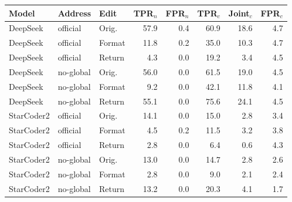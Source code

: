 \begin{tabular}{lllrrrrr}
\toprule
Model & Address & Edit & TPR$_n$ & FPR$_n$ & TPR$_c$ & Joint$_c$ & FPR$_c$ \\
\midrule
DeepSeek & official & Orig. & 57.9 & 0.4 & 60.9 & 18.6 & 4.7 \\
DeepSeek & official & Format & 11.8 & 0.2 & 35.0 & 10.3 & 4.7 \\
DeepSeek & official & Return & 4.3 & 0.0 & 19.2 & 3.4 & 4.5 \\
DeepSeek & no-global & Orig. & 56.0 & 0.0 & 61.5 & 19.0 & 4.5 \\
DeepSeek & no-global & Format & 9.2 & 0.0 & 42.1 & 11.8 & 4.1 \\
DeepSeek & no-global & Return & 55.1 & 0.0 & 75.6 & 24.1 & 4.5 \\
StarCoder2 & official & Orig. & 14.1 & 0.0 & 15.0 & 2.8 & 3.4 \\
StarCoder2 & official & Format & 4.5 & 0.2 & 11.5 & 3.2 & 3.8 \\
StarCoder2 & official & Return & 2.8 & 0.0 & 6.4 & 0.6 & 4.3 \\
StarCoder2 & no-global & Orig. & 13.0 & 0.0 & 14.7 & 2.8 & 2.6 \\
StarCoder2 & no-global & Format & 2.8 & 0.0 & 9.0 & 2.1 & 2.4 \\
StarCoder2 & no-global & Return & 13.2 & 0.0 & 20.3 & 4.1 & 1.7 \\
\bottomrule
\end{tabular}
